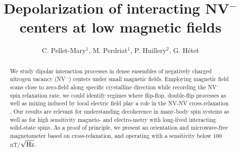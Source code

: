 \documentclass[preprintnumbers,amsmath,amssymb,superscriptaddress,twocolumn,showpacs]{revtex4-2}
\begin{document}
\title{Depolarization of interacting NV$^-$ centers at low magnetic fields}

\author{C. Pellet-Mary$^1$, M. Perdriat$^1$, P. Huillery$^2$,  G. H\'etet} 


\begin{abstract}
We study dipolar interaction processes in dense ensembles of negatively charged nitrogen vacancy (NV$^-$) centers under small magnetic fields. Employing magnetic field scans close to zero-field along specific crystalline direction while recording the NV$^-$ spin relaxation rate, we could identify regimes where flip-flop, double-flip processes as well as mixing induced by local electric field play a role in the NV-NV cross-relaxation .
Our results are relevant for understanding decoherence in many-body spin systems as well as for high sensitivity magneto- and electro-metry with long-lived interacting solid-state spins. As a proof of principle, we present an orientation and microwave-free magnetometer based on cross-relaxation, and operating with a sensitivity below $100$ nT/$\sqrt{\rm Hz}$.
\end{abstract}

\maketitle
\end{document}
